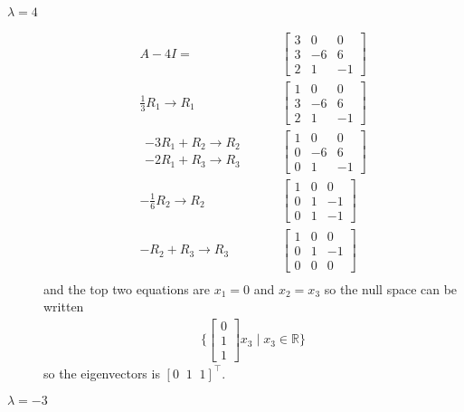 \begin{example}
\begin{description}
\item[$\lambda=4$]

\begin{align*}
A-4I = & \begin{bmatrix}
3 & 0 & 0 \\
3 & -6 & 6 \\
2 & 1 & -1
\end{bmatrix} \\
\frac{1}{3} R_1 \rightarrow R_1 \qquad &
\begin{bmatrix}
1 & 0 & 0 \\
3 & -6 & 6 \\
2 & 1 & -1
\end{bmatrix} \\
\begin{array}{r}
-3R_1 + R_2 \rightarrow R_2 \\
-2R_1 + R_3 \rightarrow R_3 
\end{array} \qquad & 
\begin{bmatrix}
1 & 0 & 0 \\
0 & -6 & 6 \\
0 & 1 & -1 
\end{bmatrix} \\
-\frac{1}{6} R_2 \rightarrow R_2 \qquad & 
\begin{bmatrix}
1 & 0 & 0 \\
0 & 1 & -1 \\
0 & 1 & -1 
\end{bmatrix} \\
-R_2 + R_3 \rightarrow R_3 \qquad &
\begin{bmatrix}
1 & 0 & 0 \\
0 & 1 & -1 \\
0 & 0 & 0 
\end{bmatrix} \\
\end{align*}
%
and the top two equations are $x_1=0$ and $x_2=x_3$ so the null space can be written
%
\begin{align*}
\{ \begin{bmatrix}
0 \\ 1 \\ 1
\end{bmatrix} x_3 \; |\; x_3 \in \mathbb{R} \}
\end{align*}
so the eigenvectors is $[0\;\;1\;\;1]^{\intercal}$.  

\item[$\lambda=-3$]


\end{description}
\end{example}
